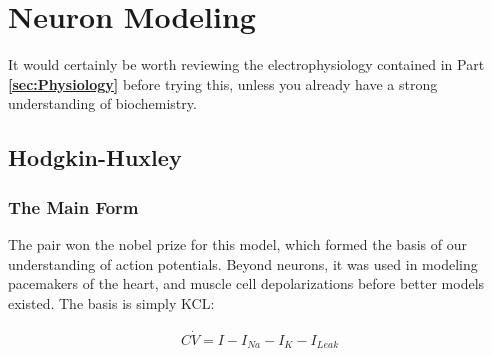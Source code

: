 \documentclass[12pt]{report}
\newcommand{\pr}[1]{\left(#1\right)}
\begin{document}




\chapter{Neuron Modeling}

It would certainly be worth reviewing the electrophysiology contained in Part \textbf{\ref{sec:Physiology}} before trying this, unless you already have a strong understanding of biochemistry.  


\section{Hodgkin-Huxley} 

\subsection{The Main Form} The pair won the nobel prize for this model, which formed the basis of our understanding of action potentials. Beyond neurons, it was used in modeling pacemakers of the heart, and muscle cell depolarizations before better models existed.  The basis is simply KCL: 

\bigskip

\begin{equation} \label{hh1}
\begin{split}
C\dot{V} = I - I_{Na} - I_{K} - I_{Leak}
\end{split}
\end{equation}

\bigskip
\end{document}

